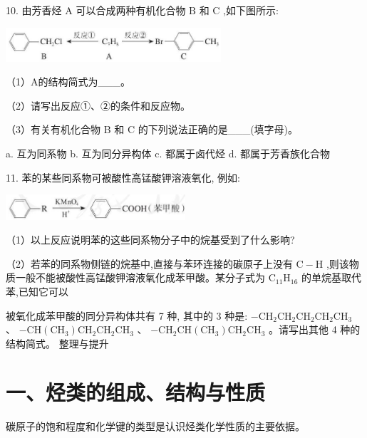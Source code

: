 \documentclass[10pt]{article}
\begin{document}
10. 由芳香烃 \(\mathrm{A}\) 可以合成两种有机化合物 \(\mathrm{B}\) 和 \(\mathrm{C}\) ,如下图所示:

\begin{center}
\includegraphics[max width=0.6\textwidth]{images/0190efc5-b58a-7c43-bfb0-e0a030df9cfd_54_757563.jpg}
\end{center}

（1）A的结构简式为\_\_\_。

（2）请写出反应①、②的条件和反应物。

（3）有关有机化合物 B 和 C 的下列说法正确的是\_\_\_(填字母)。

a. 互为同系物 b. 互为同分异构体 c. 都属于卤代烃 d. 都属于芳香族化合物

11. 苯的某些同系物可被酸性高锰酸钾溶液氧化, 例如:

\begin{center}
\includegraphics[max width=0.5\textwidth]{images/0190efc5-b58a-7c43-bfb0-e0a030df9cfd_54_229115.jpg}
\end{center}

（1）以上反应说明苯的这些同系物分子中的烷基受到了什么影响?

（2）若苯的同系物侧链的烷基中,直接与苯环连接的碳原子上没有 \(\mathrm{C} - \mathrm{H}\) ,则该物质一般不能被酸性高锰酸钾溶液氧化成苯甲酸。某分子式为 \({\mathrm{C}}_{11}{\mathrm{H}}_{16}\) 的单烷基取代苯,已知它可以

被氧化成苯甲酸的同分异构体共有 7 种, 其中的 3 种是: \(- {\mathrm{{CH}}}_{2}{\mathrm{{CH}}}_{2}{\mathrm{{CH}}}_{2}{\mathrm{{CH}}}_{2}{\mathrm{{CH}}}_{3}\) 、 \(- \mathrm{{CH}}\left( {\mathrm{{CH}}}_{3}\right) {\mathrm{{CH}}}_{2}{\mathrm{{CH}}}_{2}{\mathrm{{CH}}}_{3}\) 、 \(- {\mathrm{{CH}}}_{2}\mathrm{{CH}}\left( {\mathrm{{CH}}}_{3}\right) {\mathrm{{CH}}}_{2}{\mathrm{{CH}}}_{3}\) 。请写出其他 4 种的结构简式。 整理与提升

\section*{一、烃类的组成、结构与性质}

碳原子的饱和程度和化学键的类型是认识烃类化学性质的主要依据。
\end{document}
